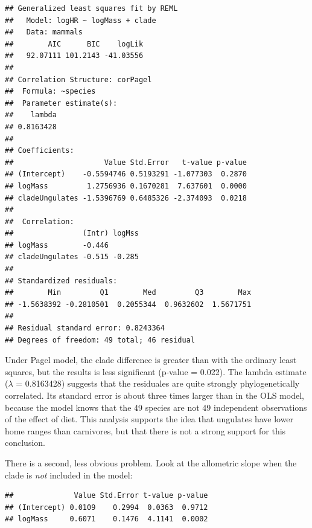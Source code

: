 \documentclass[
]{book}
\newenvironment{Shaded}{\begin{snugshade}}{\end{snugshade}}
\newcommand{\AttributeTok}[1]{\textcolor[rgb]{0.13,0.29,0.53}{#1}}
\newcommand{\DecValTok}[1]{\textcolor[rgb]{0.00,0.00,0.81}{#1}}
\newcommand{\FunctionTok}[1]{\textcolor[rgb]{0.13,0.29,0.53}{\textbf{#1}}}
\newcommand{\NormalTok}[1]{#1}
\newcommand{\SpecialCharTok}[1]{\textcolor[rgb]{0.81,0.36,0.00}{\textbf{#1}}}
\begin{document}
\begin{verbatim}
## Generalized least squares fit by REML
##   Model: logHR ~ logMass + clade 
##   Data: mammals 
##        AIC      BIC    logLik
##   92.07111 101.2143 -41.03556
## 
## Correlation Structure: corPagel
##  Formula: ~species 
##  Parameter estimate(s):
##    lambda 
## 0.8163428 
## 
## Coefficients:
##                     Value Std.Error   t-value p-value
## (Intercept)    -0.5594746 0.5193291 -1.077303  0.2870
## logMass         1.2756936 0.1670281  7.637601  0.0000
## cladeUngulates -1.5396769 0.6485326 -2.374093  0.0218
## 
##  Correlation: 
##                (Intr) logMss
## logMass        -0.446       
## cladeUngulates -0.515 -0.285
## 
## Standardized residuals:
##        Min         Q1        Med         Q3        Max 
## -1.5638392 -0.2810501  0.2055344  0.9632602  1.5671751 
## 
## Residual standard error: 0.8243364 
## Degrees of freedom: 49 total; 46 residual
\end{verbatim}

Under Pagel model, the clade difference is greater than with the ordinary least squares, but the results is less significant (p-value = 0.022). The lambda estimate (\(\lambda\) = 0.8163428) suggests that the residuales are quite strongly phylogenetically correlated. Its standard error is about three times larger than in the OLS model, because the model knows that the 49 species are not 49 independent observations of the effect of diet. This analysis supports the idea that ungulates have lower home ranges than carnivores, but that there is not a strong support for this conclusion.

There is a second, less obvious problem. Look at the allometric slope when the clade is \emph{not} included in the model:

\begin{Shaded}
\end{Shaded}

\begin{verbatim}
##              Value Std.Error t-value p-value
## (Intercept) 0.0109    0.2994  0.0363  0.9712
## logMass     0.6071    0.1476  4.1141  0.0002
\end{verbatim}
\end{document}
